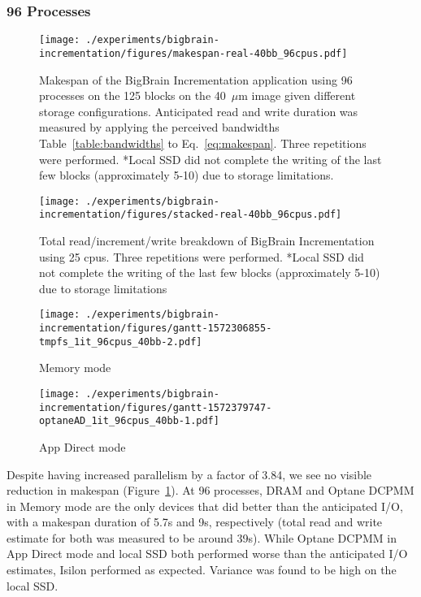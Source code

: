 \documentclass[conference]{IEEEtran}
\newcommand{\bigbrain}{BigBrain\xspace}
\begin{document}
\subsubsection{96 Processes}
\begin{figure}
    \texttt{[image: ./experiments/bigbrain-incrementation/figures/makespan-real-40bb\_96cpus.pdf]}
    \captionsetup{belowskip=-10pt}
    \caption{Makespan of the \bigbrain Incrementation application using 96 
             processes on the 125 blocks on the 40~$\mu$m image given different
             storage configurations. Anticipated read and write duration was 
             measured by applying the perceived bandwidths Table~\ref{table:bandwidths}
             to Eq.~\ref{eq:makespan}. Three 
             repetitions were performed. *Local SSD did not complete the
         writing of the last few blocks (approximately 5-10) due to storage limitations.}\label{fig:makespan-96cpus}
\end{figure}
\begin{figure}
    \texttt{[image: ./experiments/bigbrain-incrementation/figures/stacked-real-40bb\_96cpus.pdf]}
    \captionsetup{belowskip=-10pt}
    \caption{Total read/increment/write breakdown of \bigbrain Incrementation using 25 cpus. Three repetitions were performed. *Local SSD did not
    complete the writing of the last few blocks (approximately 5-10) due to storage limitations}\label{fig:stacked-96cpus}
\end{figure}

\begin{figure*}
    \begin{subfigure}{\columnwidth}
        \centering
    \texttt{[image: ./experiments/bigbrain-incrementation/figures/gantt-1572306855-tmpfs\_1it\_96cpus\_40bb-2.pdf]}
    \caption{Memory mode}
\end{subfigure}
\begin{subfigure}{\columnwidth}
        \centering
    \texttt{[image: ./experiments/bigbrain-incrementation/figures/gantt-1572379747-optaneAD\_1it\_96cpus\_40bb-1.pdf]}
    \caption{App Direct mode}
\end{subfigure}
    \captionsetup{belowskip=-10pt}
\caption{Gantt charts for Optane DCPMM processing 125 blocks of the 40$\mu$m BigBrain using 96 processes}\label{fig:gantt96}
\end{figure*}

Despite having increased parallelism by a factor of 3.84, we see no visible reduction
in makespan (Figure~\ref{fig:makespan-96cpus}). At 96 processes, DRAM and Optane DCPMM in Memory mode are the only devices that did better than the anticipated I/O, with a makespan duration of
5.7s and 9s, respectively (total read and write estimate for both was measured to be around 39s). While
Optane DCPMM in App Direct mode and local SSD both performed worse than the anticipated I/O estimates, Isilon
performed as expected. Variance was found to be high on the local SSD.
\end{document}
